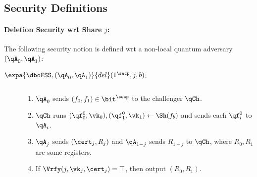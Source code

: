 \subsection{Security Definitions}
\paragraph{Deletion Security wrt Share $j$:}
The following security notion is defined wrt a non-local quantum
adversary $(\qA_0, \qA_1)$:

\begin{description}
\item [$\expa{\dboFSS, (\qA_0, \qA_1)}{del}(1^\secp, j, b)$:] $ $
\begin{enumerate}
\item $\qA_0$ sends $(f_0, f_1) \in \bit^\secp$ to the challenger
$\qCh$.
\item 
$\qCh$ runs
$(\qf_0^0, \vk_0), (\qf_1^0, \vk_1) \gets \Sh(f_b)$ and sends each
$\qf_i^0$ to $\qA_i$.

\item $\qA_j$ sends $(\cert_j, R_j)$ and $\qA_{1-j}$ sends $R_{1-j}$
to $\qCh$, where $R_0, R_1$ are some registers.
\item If $\Vrfy(j, \vk_j, \cert_j) = \top$, then output $(R_0, R_1)$.
\end{enumerate}
\end{description}

